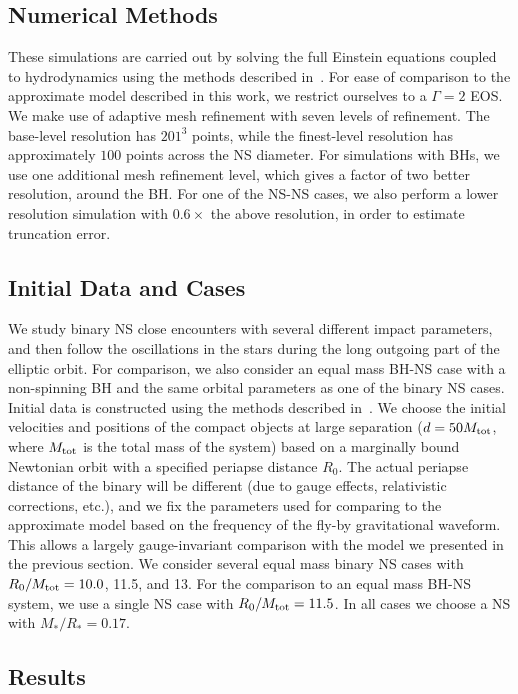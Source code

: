 \documentclass[prd,aps,floatfix,superscriptaddress,nofootinbib,twocolumn,10pt,English]{revtex4}
\begin{document}
\subsection{Numerical Methods}
These simulations are carried out by solving the full Einstein equations
coupled to hydrodynamics using the methods described in~\cite{code_paper}. For
ease of comparison to the approximate model described in this work, we restrict
ourselves to a $\Gamma=2$ EOS. We
make use of adaptive mesh refinement with seven levels of refinement.
The base-level resolution has $201^3$ points, while the 
finest-level resolution has approximately $100$ points across the NS diameter.
For simulations with BHs, we use one additional mesh refinement level, which
gives a factor of two better resolution, around the BH.
For one of the NS-NS cases, we also perform a lower resolution simulation with
$0.6\times$ the above resolution, in order to estimate truncation error.

\subsection{Initial Data and Cases}
We study binary NS close encounters with several different impact
parameters, and then follow the oscillations in the stars during the
long outgoing part of the elliptic orbit.  For comparison, we also
consider an equal mass BH-NS case with a non-spinning BH and the same
orbital parameters as one of the binary NS cases. Initial data is
constructed using the methods described in~\cite{idsolve_paper}. We
choose the initial velocities and positions of the compact objects at
large separation ($d=50M_{\rm tot}$, where $M_{\rm tot}$ is the total
mass of the system) based on a marginally bound Newtonian orbit with a
specified periapse distance $R_0$.  The actual periapse distance of
the binary will be different (due to gauge effects, relativistic corrections, etc.), 
and we fix the parameters used
for comparing to the approximate model based on the frequency of the
fly-by gravitational waveform. This allows a largely gauge-invariant
comparison with the model we presented in the previous section.  We
consider several equal mass binary NS cases with $R_0/M_{\rm
  tot}=10.0$, 11.5, and 13. For the comparison to an equal mass BH-NS system, we 
use a single NS case with $R_0/M_{\rm tot}=11.5$.
In all cases we choose a NS with
$M_*/R_*=0.17$.

\subsection{Results}
\end{document}
